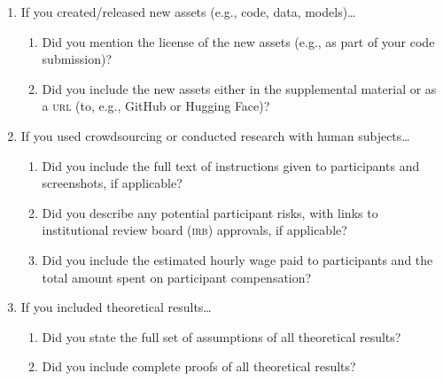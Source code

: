 \documentclass[11pt]{article}
\begin{document}
\begin{enumerate}
\begin{enumerate}
  \item Did you discuss whether and how consent was obtained from people whose
    data you're using/curating if the license requires it?
  \item Did you discuss whether the data you are using/curating contains
    personally identifiable information or offensive content?
  \end{enumerate}
\item If you created/released new assets (e.g., code, data, models)\dots
  \begin{enumerate}
    \item Did you mention the license of the new assets (e.g., as part of your
    code submission)?
    \item Did you include the new assets either in the supplemental material or as
    a \textsc{url} (to, e.g., GitHub or Hugging Face)?
  \end{enumerate}
\item If you used crowdsourcing or conducted research with human subjects\dots
  \begin{enumerate}
  \item Did you include the full text of instructions given to participants and
    screenshots, if applicable?
  \item Did you describe any potential participant risks, with links to
    institutional review board (\textsc{irb}) approvals, if applicable?
  \item Did you include the estimated hourly wage paid to participants and the
    total amount spent on participant compensation?
  \end{enumerate}
\item If you included theoretical results\dots
  \begin{enumerate}
  \item Did you state the full set of assumptions of all theoretical results?
  \item Did you include complete proofs of all theoretical results?
  \end{enumerate}
\end{enumerate}
\end{document}
